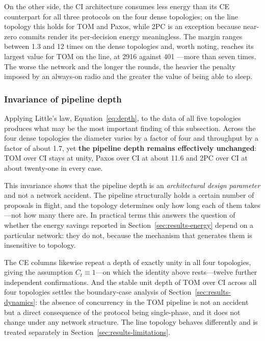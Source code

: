 \documentclass[journal]{IEEEtran}
\newcommand{\CI}{CI}                      %
\newcommand{\CE}{CE}                      %
\begin{document}
On the other side, the \CI{} architecture consumes less energy than its
\CE{} counterpart for all three protocols on the four dense topologies; on
the line topology this holds for TOM and Paxos, while 2PC is an exception
because near-zero commits render its per-decision energy meaningless. The
margin ranges between 1.3 and 12 times on the dense topologies and, worth
noting, reaches its largest value for TOM on the line, at 2916 against 401
---more than seven times. The worse the network and the longer the rounds,
the heavier the penalty imposed by an always-on radio and the greater the
value of being able to sleep.

\subsubsection{Invariance of pipeline depth}

Applying Little's law, Equation~\eqref{eq:depth}, to the data of all five
topologies produces what may be the most important finding of this
subsection. Across the four dense topologies the diameter varies by a
factor of four and throughput by a factor of about 1.7, yet
\textbf{the pipeline depth remains effectively unchanged}: TOM over \CI{}
stays at unity, Paxos over \CI{} at about 11.6 and 2PC over \CI{} at about
twenty-one in every case.

This invariance shows that the pipeline depth is an
\emph{architectural design parameter} and not a network accident. The
pipeline structurally holds a certain number of proposals in flight, and
the topology determines only how long each of them takes---not how many
there are. In practical terms this answers the question of whether the
energy savings reported in Section~\ref{sec:results-energy} depend on a
particular network: they do not, because the mechanism that generates them
is insensitive to topology.

The \CE{} columns likewise repeat a depth of exactly unity in all four
topologies, giving the assumption $C_t \equiv 1$---on which the identity
above rests---twelve further independent confirmations. And the stable
unit depth of TOM over \CI{} across all four topologies settles the
boundary-case analysis of Section~\ref{sec:results-dynamics}: the absence
of concurrency in the TOM pipeline is not an accident but a direct
consequence of the protocol being single-phase, and it does not change
under any network structure. The line topology behaves differently and is
treated separately in Section~\ref{sec:results-limitations}.
\end{document}
